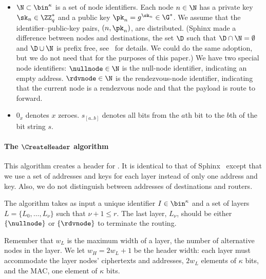 \begin{itemize}
  \item \(\N\subset \bin^\kappa\) is a set of node identifiers.
    Each node \(n\in \N\) has a private key \(\sk_n\in \ZZ_q^*\) and a public 
    key \(\pk_n = g^{\sk_n}\in \G^*\).
    We assume that the identifier--public-key pairs, \((n, \pk_n)\), are 
    distributed.
    (Sphinx made a difference between nodes and destinations, \ie the set 
    \(\D\) such that \(\D\cap \N = \emptyset\) and \(\D\cup \N\) is prefix 
    free, see~\cite{Sphinx} for details.
    We could do the same adoption, but we do not need that for the purposes of 
    this paper.)
    We have two special node identifiers:
    \(\nullnode\in \N\) is the null-node identifier, indicating an empty 
    address.
    \(\rdvnode\in \N\) is the rendezvous-node identifier, indicating that the 
    current node is a rendezvous node and that the payload is  route 
    to forward.

  \item \(0_x\) denotes \(x\) zeroes.
    \(s_{[a..b]}\) denotes all bits from the \(a\)th bit to the \(b\)th of the 
    bit string \(s\).
\end{itemize}

\paragraph*{The \(\CreateHeader\) algorithm}

This algorithm creates a header for .
It is identical to that of Sphinx~\cite[\S 3.2]{Sphinx} except that we use a 
set of addresses and keys for each layer instead of only one address and key.
Also, we do not distinguish between addresses of destinations and routers.

The algorithm takes as input a unique identifier \(I\in \bin^\kappa\) and a set 
of layers \(L = \{L_0, \dotsc, L_\nu\}\) such that \(\nu+1\leq r\).
The last layer, \(L_\nu\), should be either \(\{\nullnode\}\) or 
\(\{\rdvnode\}\) to terminate the routing.

Remember that \(w_L\) is the maximum width of a layer, \ie the number of 
alternative nodes in the layer.
We let \(w_H = 2w_L+1\) be the header width:
each layer must accommodate the layer nodes' ciphertexts and addresses, \ie  
\(2w_L\) elements of \(\kappa\) bits,
and the \ac{MAC}, \ie one element of \(\kappa\) bits.

